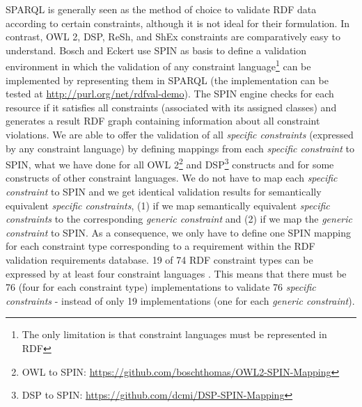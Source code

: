 \documentclass{llncs}
\begin{document}
SPARQL is generally seen as the method of choice to validate RDF data according to certain constraints, although it is not ideal for their formulation. 
In contrast, OWL 2, DSP, ReSh, and ShEx constraints are comparatively easy to understand. 
Bosch and Eckert \cite{BoschEckert2014-2} use SPIN as basis to define a
validation environment in which the validation of any constraint language\footnote{The only limitation is that constraint languages must be represented in RDF} can be implemented by representing them in SPARQL
(the implementation can be tested at \url{http://purl.org/net/rdfval-demo}).
The SPIN engine checks for each resource if it satisfies all constraints (associated with its assigned classes) and generates a result RDF graph containing information about all constraint violations.
We are able to offer the validation of all \emph{specific constraints} (expressed by any constraint language) by defining mappings from each \emph{specific constraint} to SPIN, 
what we have done for all OWL 2\footnote{OWL to SPIN: \url{https://github.com/boschthomas/OWL2-SPIN-Mapping}} and DSP\footnote{DSP to SPIN: \url{https://github.com/dcmi/DSP-SPIN-Mapping}} constructs and for some constructs of other constraint languages.
We do not have to map each \emph{specific constraint} to SPIN and we get identical validation results for semantically equivalent \emph{specific constraints},
(1) if we map semantically equivalent \emph{specific constraints} to the corresponding \emph{generic constraint} and 
(2) if we map the \emph{generic constraint} to SPIN.
As a consequence, we only have to define one SPIN mapping for each constraint type corresponding to a requirement within the RDF validation requirements database.
19 of 74 RDF constraint types can be expressed by at least four constraint languages \cite{BoschNolleAcarEckert2015}.
This means that there must be 76 (four for each constraint type) implementations to validate 76 \emph{specific constraints} - instead of only 19 implementations (one for each \emph{generic constraint}).

\end{document}
